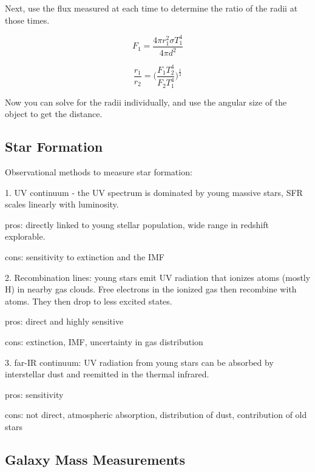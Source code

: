 Next, use the flux measured at each time to determine the ratio of the radii at those times.

\begin{equation}
F_1 = \frac{4\pi r_1^2\sigma T_1^4}{4\pi d^2}
\end{equation}

\begin{equation}
\frac{r_1}{r_2} = \bigg(\frac{F_1T_2^4}{F_2T_1^4}\bigg)^{\frac{1}{2}}
\end{equation}

Now you can solve for the radii individually, and use the angular size of the object to get the distance.  


\subsection{Star Formation}

Observational methods to measure star formation:

1.  UV continuum - the UV spectrum is dominated by young massive stars, SFR scales linearly with luminosity.
	
	pros:  directly linked to young stellar population, wide range in redshift explorable.
	
	cons:  sensitivity to extinction and the IMF
	
2.  Recombination lines:  young stars emit UV radiation that ionizes atoms (mostly H) in nearby gas clouds.  Free electrons in the ionized gas then recombine with atoms.  They then drop to less excited states.  

	pros:  direct and highly sensitive
	
	cons:  extinction, IMF, uncertainty in gas distribution
	
3.  far-IR continuum:  UV radiation from young stars can be absorbed by interstellar dust and reemitted in the thermal infrared.

	pros:  sensitivity
	
	cons:  not direct, atmospheric absorption, distribution of dust, contribution of old stars


\subsection{Galaxy Mass Measurements}

